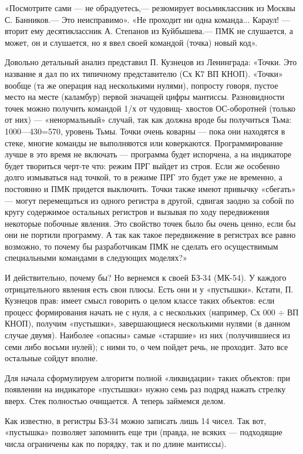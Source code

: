 \documentclass[11pt,a4paper,oneside]{article}
\begin{document}
«Посмотрите сами — не обрадуетесь,— резюмирует восьмиклассник из Москвы С. Банников.— Это неисправимо». «Не проходит ни одна команда... Караул! — вторит ему десятиклассник А. Степанов из Куйбышева.— ПМК не слушается, а может, он и слушается, но я ввел своей командой (точка) новый код».

Довольно детальный анализ представил П. Кузнецов из Ленинграда: «Точки. Это название я дал по их типичному представителю (Сх К7 ВП КНОП). «Точки» вообще (та же операция над несколькими нулями), попросту говоря, пустое место на месте (каламбур) первой значащей цифры мантиссы. Разновидности точек можно получить командой 1/х от чудовищ- хвостов ОС-оборотней (только от них) — «ненормальный» случай, так как должна вроде бы получиться Тьма: 1000—430=570, уровень Тьмы. Точки очень коварны — пока они находятся в стеке, многие команды не выполняются или коверкаются. Программирование лучше в это время не включать — программа будет испорчена, а на индикаторе будет твориться черт-те что: режим ПРГ выйдет из строя. Если же особенно долго измываться над точкой, то в режиме ПРГ это будет уже не временно, а постоянно и ПМК придется выключить. Точки также имеют привычку «сбегать» — могут перемещаться из одного регистра в другой, сдвигая заодно за собой по кругу содержимое остальных регистров и вызывая по ходу передвижения некоторые побочные явления. Это свойство точек было бы очень ценно, если бы они не портили программу. А так как такое передвижение в регистрах все равно возможно, то почему бы разработчикам ПМК не сделать его осуществимым специальными командами в следующих моделях?»

И действительно, почему бы? Но вернемся к своей БЗ-34 (МК-54). У каждого отрицательного явления есть свои плюсы. Есть они и у «пустышки». Кстати, П. Кузнецов прав: имеет смысл говорить о целом классе таких объектов: если процесс формирования начать не с нуля, а с нескольких (например, Сх 000 $\div$ ВП КНОП), получим «пустышки», завершающиеся несколькими нулями (в данном случае двумя). Наиболее «опасны» самые «старшие» из них (получившиеся из семи либо восьми нулей); с ними то, о чем пойдет речь, не проходит. Зато все остальные сойдут вполне.

Для начала сформулируем алгоритм полной «ликвидации» таких объектов: при появлении на индикаторе «пустышки» нужно семь раз подряд нажать стрелку вверх. Стек полностью очищается. А теперь займемся делом.

Как известно, в регистры БЗ-34 можно записать лишь 14 чисел. Так вот, «пустышка» позволяет запомнить еще три (правда, не всяких — подходящие числа ограничены как по порядку, так и по длине мантиссы).
\end{document}
